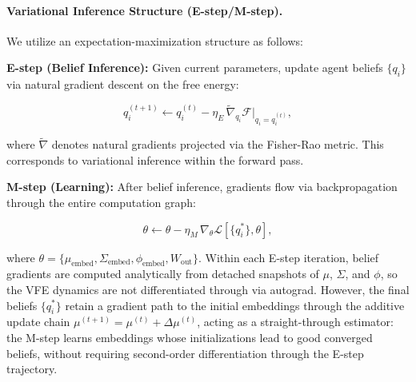 \documentclass[twoside,11pt]{article}
\begin{document}
\paragraph{Variational Inference Structure (E-step/M-step).}
We utilize an expectation-maximization structure as follows:

\textbf{E-step (Belief Inference):} Given current parameters, update agent beliefs $\{q_i\}$ via natural gradient descent on the free energy:

\begin{equation}
q_i^{(t+1)} \leftarrow q_i^{(t)} - \eta_E \, \tilde{\nabla}_{q_i} \mathcal{F}\big|_{q_i = q_i^{(t)}},
\end{equation}

where $\tilde{\nabla}$ denotes natural gradients projected via the Fisher-Rao metric. This corresponds to variational inference within the forward pass.

\textbf{M-step (Learning):} After belief inference, gradients flow via backpropagation through the entire computation graph:

\begin{equation}
\theta \leftarrow \theta - \eta_M \, \nabla_{\theta} \mathcal{L}[\{q_i^*\}, \theta],
\end{equation}

where $\theta = \{\mu_{\text{embed}}, \Sigma_{\text{embed}}, \phi_{\text{embed}}, W_{\text{out}}\}$. Within each E-step iteration, belief gradients are computed analytically from detached snapshots of $\mu$, $\Sigma$, and $\phi$, so the VFE dynamics are not differentiated through via autograd. However, the final beliefs $\{q_i^*\}$ retain a gradient path to the initial embeddings through the additive update chain $\mu^{(t+1)} = \mu^{(t)} + \Delta\mu^{(t)}$, acting as a straight-through estimator: the M-step learns embeddings whose initializations lead to good converged beliefs, without requiring second-order differentiation through the E-step trajectory.
\end{document}
